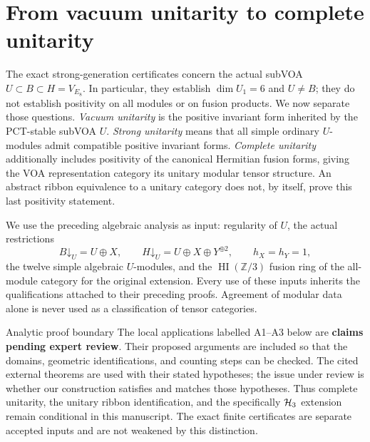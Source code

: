 
\section{From vacuum unitarity to complete unitarity}
\label{sec:analytic-unitarity}

The exact strong-generation certificates concern the actual subVOA
$U\subset B\subset H=V_{E_8}$.  In particular, they establish
$\dim U_1=6$ and $U\ne B$; they do not establish positivity on all
modules or on fusion products.  We now separate those questions.
\emph{Vacuum unitarity} is the positive invariant form inherited by the
PCT-stable subVOA $U$.  \emph{Strong unitarity} means that all simple
ordinary $U$-modules admit compatible positive invariant forms.
\emph{Complete unitarity} additionally includes positivity of the
canonical Hermitian fusion forms, giving the VOA representation category
its unitary modular tensor structure.  An abstract ribbon equivalence to
a unitary category does not, by itself, prove this last positivity statement.

We use the preceding algebraic analysis as input: regularity of $U$,
the actual restrictions
\begin{equation}
 B\mathord\downarrow_U=U\oplus X,
 \qquad
 H\mathord\downarrow_U=U\oplus X\oplus Y^{\oplus2},
 \qquad h_X=h_Y=1,
 \label{eq:analytic-branching}
\end{equation}
the twelve simple algebraic $U$-modules, and the
$\operatorname{HI}(\mathbb Z/3)$ fusion ring of the all-module category
for the original extension.  Every use of these inputs inherits the
qualifications attached to their preceding proofs.  Agreement of modular
data alone is never used as a classification of tensor categories.

\begin{criticalnote}{Analytic proof boundary}
The local applications labelled A1--A3 below are \textbf{claims pending
expert review}.  Their proposed arguments are included so that the
domains, geometric identifications, and counting steps can be checked.
The cited external theorems are used with their stated hypotheses;
the issue under review is whether our construction satisfies and matches
those hypotheses.  Thus complete unitarity, the unitary ribbon
identification, and the specifically $\mathcal H_3$ extension remain conditional
in this manuscript.  The exact finite certificates are separate accepted
inputs and are not weakened by this distinction.
\end{criticalnote}

